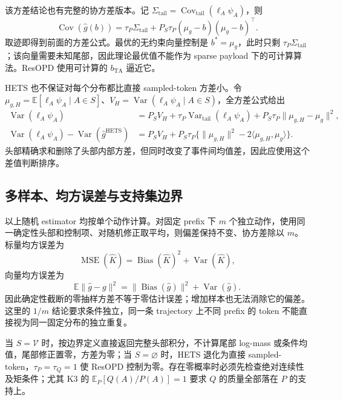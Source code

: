 \documentclass[lang=cn,scheme=chinese,openany]{../book/elegantbook}
\newcommand{\E}{\mathbb E}
\newcommand{\Var}{\operatorname{Var}}
\newcommand{\tail}{\mathrm{tail}}
\begin{document}
该方差结论也有完整的协方差版本。记 $\Sigma_{\tail}=\operatorname{Cov}_{\tail}(\ell_A\psi_A)$，则
\begin{equation*}
 \operatorname{Cov}(\widehat g(b))
 =\tau_P\Sigma_{\tail}
  +P_S\tau_P(\mu_g-b)(\mu_g-b)^\top.
\end{equation*}
取迹即得到前面的方差公式。最优的无约束向量控制是 $b^*=\mu_g$，此时只剩 $\tau_P\Sigma_{\tail}$；该向量需要未知尾部，因此理论最优值不能作为 sparse payload 下的可计算算法。ResOPD 使用可计算的 $b_{\mathrm{TA}}$ 逼近它。

HETS 也不保证对每个分布都比直接 sampled-token 方差小。令 $\mu_{g,H}=\E[\ell_A\psi_A\mid A\in S]$、$V_H=\Var(\ell_A\psi_A\mid A\in S)$，全方差公式给出
\begin{align*}
 \Var(\ell_A\psi_A)&=P_SV_H+\tau_P\Var_{\tail}(\ell_A\psi_A)
 +P_S\tau_P\lVert\mu_{g,H}-\mu_g\rVert^2,\\
 \Var(\ell_A\psi_A)-\Var(\widehat g^{\mathrm{HETS}})
 &=P_SV_H+P_S\tau_P\{\lVert\mu_{g,H}\rVert^2
 -2\langle\mu_{g,H},\mu_g\rangle\}.
\end{align*}
头部精确求和删除了头部内部方差，但同时改变了事件间均值差，因此应使用这个差值判断排序。

\subsection{多样本、均方误差与支持集边界}

以上随机 estimator 均按单个动作计算。对固定 prefix 下 $m$ 个独立动作，使用同一确定性头部和控制项、对随机修正取平均，则偏差保持不变、协方差除以 $m$。标量均方误差为
\begin{equation*}
 \operatorname{MSE}(\widehat K)=\operatorname{Bias}(\widehat K)^2+\Var(\widehat K),
\end{equation*}
向量均方误差为
\begin{equation*}
 \E\lVert\widehat g-g\rVert^2
 =\lVert\operatorname{Bias}(\widehat g)\rVert^2+\Var(\widehat g).
\end{equation*}
因此确定性截断的零抽样方差不等于零估计误差；增加样本也无法消除它的偏差。这里的 $1/m$ 结论要求条件独立，同一条 trajectory 上不同 prefix 的 token 不能直接视为同一固定分布的独立重复。

当 $S=\mathcal V$ 时，按边界定义直接返回完整头部积分，不计算尾部 log-mass 或条件均值，尾部修正置零，方差为零；当 $S=\varnothing$ 时，HETS 退化为直接 sampled-token，$\tau_P=\tau_Q=1$ 使 ResOPD 控制为零。存在零概率时必须先检查绝对连续性及矩条件；尤其 K3 的 $\E_P[Q(A)/P(A)]=1$ 要求 $Q$ 的质量全部落在 $P$ 的支持上。
\end{document}
